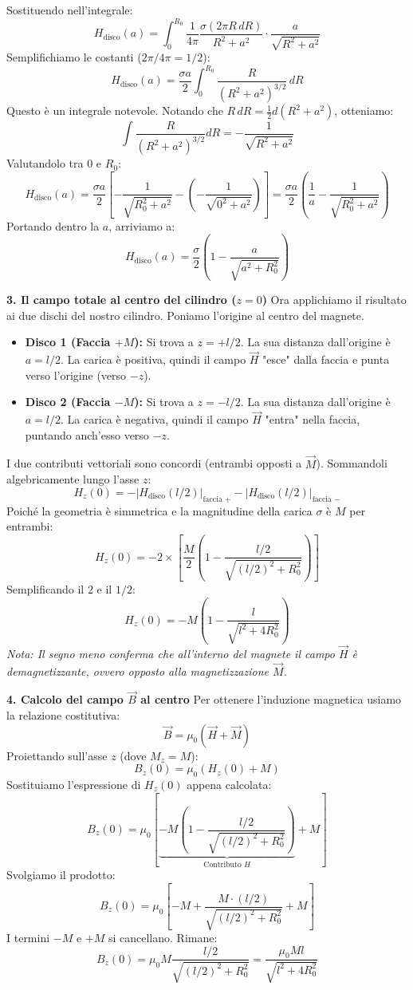 \documentclass{book}
\begin{document}
\begin{itemize}
Sostituendo nell'integrale:
\[
H_{\text{disco}}(a) = \int_0^{R_0} \frac{1}{4\pi} \frac{\sigma (2\pi R \, dR)}{R^2 + a^2} \cdot \frac{a}{\sqrt{R^2 + a^2}}
\]
Semplifichiamo le costanti (\(2\pi/4\pi = 1/2\)):
\[
H_{\text{disco}}(a) = \frac{\sigma a}{2} \int_0^{R_0} \frac{R}{(R^2 + a^2)^{3/2}} \, dR
\]
Questo è un integrale notevole. Notando che \(R \, dR = \frac{1}{2} d(R^2 + a^2)\), otteniamo:
\[
\int \frac{R}{(R^2+a^2)^{3/2}} dR = -\frac{1}{\sqrt{R^2+a^2}}
\]
Valutandolo tra \(0\) e \(R_0\):
\[
H_{\text{disco}}(a) = \frac{\sigma a}{2} \left[ -\frac{1}{\sqrt{R_0^2 + a^2}} - \left( -\frac{1}{\sqrt{0^2 + a^2}} \right) \right] = \frac{\sigma a}{2} \left( \frac{1}{a} - \frac{1}{\sqrt{R_0^2 + a^2}} \right)
\]
Portando dentro la \(a\), arriviamo a:
\[
H_{\text{disco}}(a) = \frac{\sigma}{2}\left(1 - \frac{a}{\sqrt{a^2+R_0^2}}\right)
\]

\textbf{3. Il campo totale al centro del cilindro (\(z=0\))}
Ora applichiamo il risultato ai due dischi del nostro cilindro. Poniamo l'origine al centro del magnete.
\begin{itemize}
    \item \textbf{Disco 1 (Faccia \(+M\)):} Si trova a \(z=+l/2\). La sua distanza dall'origine è \(a=l/2\). La carica è positiva, quindi il campo \(\vec{H}\) "esce" dalla faccia e punta verso l'origine (verso \(-z\)).
    \item \textbf{Disco 2 (Faccia \(-M\)):} Si trova a \(z=-l/2\). La sua distanza dall'origine è \(a=l/2\). La carica è negativa, quindi il campo \(\vec{H}\) "entra" nella faccia, puntando anch'esso verso \(-z\).
\end{itemize}

I due contributi vettoriali sono concordi (entrambi opposti a \(\vec{M}\)). Sommandoli algebricamente lungo l'asse \(z\):
\[
H_z(0) = - \left| H_{\text{disco}}(l/2) \right|_{\text{faccia } +} - \left| H_{\text{disco}}(l/2) \right|_{\text{faccia } -}
\]
Poiché la geometria è simmetrica e la magnitudine della carica \(\sigma\) è \(M\) per entrambi:
\[
H_z(0) = - 2 \times \left[ \frac{M}{2} \left( 1 - \frac{l/2}{\sqrt{(l/2)^2 + R_0^2}} \right) \right]
\]
Semplificando il \(2\) e il \(1/2\):
\[
H_z(0) = - M \left( 1 - \frac{l}{\sqrt{l^2 + 4R_0^2}} \right)
\]
\textit{Nota: Il segno meno conferma che all'interno del magnete il campo \(\vec{H}\) è demagnetizzante, ovvero opposto alla magnetizzazione \(\vec{M}\).}

\textbf{4. Calcolo del campo \(\vec{B}\) al centro}
Per ottenere l'induzione magnetica usiamo la relazione costitutiva:
\[
\vec{B} = \mu_0 (\vec{H} + \vec{M})
\]
Proiettando sull'asse \(z\) (dove \(M_z = M\)):
\[
B_z(0) = \mu_0 \left( H_z(0) + M \right)
\]
Sostituiamo l'espressione di \(H_z(0)\) appena calcolata:
\[
B_z(0) = \mu_0 \left[ \underbrace{- M \left( 1 - \frac{l/2}{\sqrt{(l/2)^2 + R_0^2}} \right)}_{\text{Contributo } H} + M \right]
\]
Svolgiamo il prodotto:
\[
B_z(0) = \mu_0 \left[ -M + \frac{M \cdot (l/2)}{\sqrt{(l/2)^2 + R_0^2}} + M \right]
\]
I termini \(-M\) e \(+M\) si cancellano. Rimane:
\[
B_z(0) = \mu_0 M \frac{l/2}{\sqrt{(l/2)^2 + R_0^2}} = \frac{\mu_0 M l}{\sqrt{l^2 + 4R_0^2}}
\]


\end{itemize}
\end{document}
